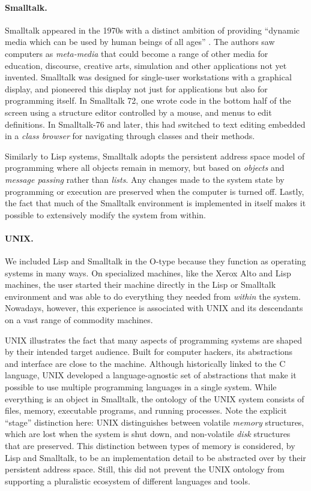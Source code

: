 \paragraph{Smalltalk.}

Smalltalk appeared in the 1970s with a distinct ambition of providing
``dynamic media which can be used by human beings of all ages''
\cite{PersonalDynMedia}. The authors saw computers as \emph{meta-media}
that could become a range of other media for education, discourse,
creative arts, simulation and other applications not yet invented.
Smalltalk was designed for single-user workstations with a graphical
display, and pioneered this display not just for applications but also
for programming itself. In Smalltalk 72, one wrote code in the bottom
half of the screen using a structure editor controlled by a mouse, and
menus to edit definitions. In Smalltalk-76 and later, this had switched
to text editing embedded in a \emph{class browser} for navigating
through classes and their methods.

Similarly to Lisp systems, Smalltalk adopts the persistent address space
model of programming where all objects remain in memory, but based on
\emph{objects} and \emph{message passing} rather than \emph{lists}. Any
changes made to the system state by programming or execution are
preserved when the computer is turned off. Lastly, the fact that much of
the Smalltalk environment is implemented in itself makes it possible to
extensively modify the system from within.

\paragraph{UNIX.}

We included Lisp and Smalltalk in the O-type because they function as
operating systems in many ways. On specialized machines, like the Xerox
Alto and Lisp machines, the user started their machine directly in the
Lisp or Smalltalk environment and was able to do everything they needed
from \emph{within} the system. Nowadays, however, this experience is
associated with UNIX and its descendants on a vast range of commodity
machines.

UNIX illustrates the fact that many aspects of programming systems are
shaped by their intended target audience. Built for computer hackers,
its abstractions and interface are close to the machine. Although
historically linked to the C language, UNIX developed a
language-agnostic set of abstractions that make it possible to use
multiple programming languages in a single system. While everything is
an object in Smalltalk, the ontology of the UNIX system consists of
files, memory, executable programs, and running processes. Note the
explicit ``stage'' distinction here: UNIX distinguishes between volatile
\emph{memory} structures, which are lost when the system is shut down,
and non-volatile \emph{disk} structures that are preserved. This
distinction between types of memory is considered, by Lisp and
Smalltalk, to be an implementation detail to be abstracted over by their
persistent address space. Still, this did not prevent the UNIX ontology
from supporting a pluralistic ecosystem of different languages and
tools.

